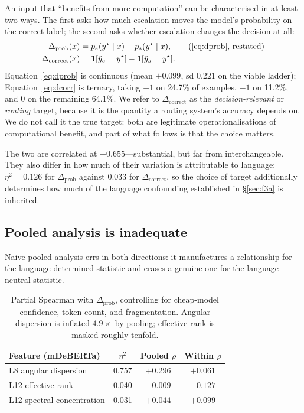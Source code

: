 \documentclass[11pt]{article}
\newcommand{\claim}[1]{#1}   %
\begin{document}
An input that ``benefits from more computation'' can be characterised in at least
two ways. The first asks how much escalation moves the model's probability on the
correct label; the second asks whether escalation changes the decision at all:
\begin{align}
\Delta_{\mathrm{prob}}(x) &= p_e(y^\star \mid x) - p_s(y^\star \mid x),
  \tag{\ref{eq:dprob}, restated}\\
\Delta_{\mathrm{correct}}(x) &= \mathbf{1}[\hat{y}_e = y^\star]
                              - \mathbf{1}[\hat{y}_s = y^\star].
  \label{eq:dcorr}
\end{align}
Equation~\ref{eq:dprob} is continuous (mean $+0.099$, sd $0.221$ on the viable
ladder); Equation~\ref{eq:dcorr} is ternary, taking $+1$ on 24.7\% of examples,
$-1$ on 11.2\%, and $0$ on the remaining 64.1\%. We refer to
$\Delta_{\mathrm{correct}}$ as the \emph{decision-relevant} or \emph{routing}
target, because it is the quantity a routing system's accuracy depends on. We do
not call it the true target: both are legitimate operationalisations of
computational benefit, and part of what follows is that the choice matters.

The two are correlated at $+0.655$---substantial, but far from interchangeable.
They also differ in how much of their variation is attributable to language:
$\eta^2 = 0.126$ for $\Delta_{\mathrm{prob}}$ against $0.033$ for
$\Delta_{\mathrm{correct}}$, so the choice of target additionally determines how
much of the language confounding established in \S\ref{sec:f3a} is inherited.

\subsection{Pooled analysis is inadequate}

\claim{Naive pooled analysis errs in both directions: it manufactures a
relationship for the language-determined statistic and erases a genuine one for
the language-neutral statistic.}

\begin{table}[t]
\centering
\small
\begin{tabular}{lccc}
\toprule
Feature (mDeBERTa) & $\eta^2$ & Pooled $\rho$ & Within $\rho$ \\
\midrule
L8 angular dispersion      & 0.757 & $+0.296$ & $+0.061$ \\
L12 effective rank         & 0.040 & $-0.009$ & $-0.127$ \\
L12 spectral concentration & 0.031 & $+0.044$ & $+0.099$ \\
\bottomrule
\end{tabular}
\caption{Partial Spearman with $\Delta_{\mathrm{prob}}$, controlling for
cheap-model confidence, token count, and fragmentation. Angular dispersion is
inflated $4.9\times$ by pooling; effective rank is masked roughly tenfold.}
\label{tab:simpson}
\end{table}
\end{document}
